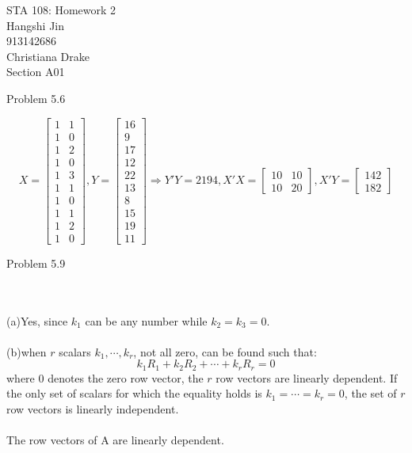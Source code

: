 \documentclass{article}
\begin{document}
\begin{flushright}STA 108: Homework 2\\ Hangshi Jin\\ 913142686\\ Christiana Drake\\ Section A01
\end{flushright}
\begin{large}Problem 5.6\end{large}
\[X=\begin{bmatrix}1&1\\1&0\\1&2\\1&0\\1&3\\1&1\\1&0\\1&1\\1&2\\1&0\end{bmatrix},Y=\begin{bmatrix}16\\9\\17\\12\\22\\13\\8\\15\\19\\11\end{bmatrix}\Rightarrow Y'Y=2194, X'X=\begin{bmatrix}10&10\\10&20\end{bmatrix},X'Y=\begin{bmatrix}142\\182\end{bmatrix}\]
\begin{large}Problem 5.9\end{large}
\\\\(a)Yes, since $k_1$ can be any number while $k_2=k_3=0$.
\\\\(b)when $r$ scalars $k_1,\cdots,k_r$, not all zero, can be found such that:
\[k_1R_1+k_2R_2+\cdots+k_rR_r=0\]
where 0 denotes the zero row vector, the $r$ row vectors are linearly dependent. If the only set of scalars for which the equality holds is $k_1=\cdots=k_r=0$, the set of $r$ row vectors is linearly independent.
\\\\The row vectors of A are linearly dependent.
\end{document}
